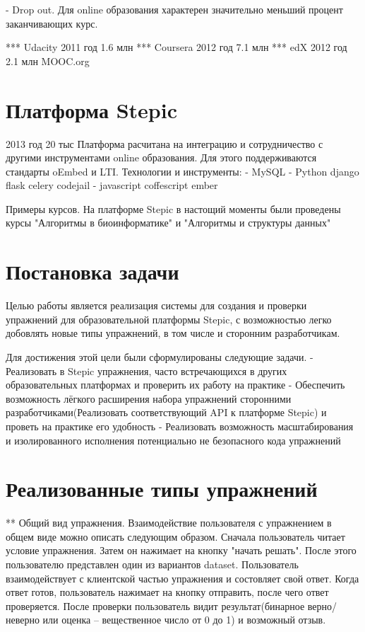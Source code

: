 \documentclass{matmex-diploma-custom}
\begin{document}
- Drop out. Для online образования характерен значительно меньший
  процент заканчивающих курс.

*** Udacity
   2011 год
   1.6 млн
*** Coursera
   2012 год
   7.1 млн
*** edX
   2012 год
   2.1 млн
   MOOC.org

\section{Платформа Stepic}
2013 год
20 тыс
Платформа расчитана на интеграцию и сотрудничество с другими инструментами
online образования. Для этого поддерживаются стандарты oEmbed и LTI.
Технологии и инструменты:
  -  MySQL
  -  Python django flask celery codejail
  -  javascript coffescript ember

Примеры курсов.
На платформе Stepic в настощий моменты были проведены курсы
"Алгоритмы в биоинформатике" и "Алгоритмы и структуры данных"

\section{Постановка задачи}
Целью работы является реализация системы для создания и проверки
упражнений для образовательной платформы Stepic, с возможностью легко
добовлять новые типы упражнений, в том числе и сторонним
разработчикам.

Для достижения этой цели были сформулированы следующие задачи.
- Реализовать в Stepic упражнения, часто встречающихся в других
  образовательных платформах и проверить их работу на практике
- Обеспечить возможность лёгкого расширения набора упражнений
  сторонними разработчиками(Реализовать соответствующий API к
  платформе Stepic) и проветь на практике его удобность
- Реализовать возможность масштабирования и изолированного исполнения
  потенциально не безопасного кода упражнений

\section{Реализованные типы упражнений}
** Общий вид упражнения.
   Взаимодействие пользователя с упражнением в общем виде можно
   описать следующим образом.  Сначала пользователь читает условие
   упражнения. Затем он нажимает на кнопку "начать решать". После
   этого пользователю представлен один из вариантов
   dataset. Пользователь взаимодействует с клиентской частью
   упражнения и состовляет свой ответ. Когда ответ готов, пользователь
   нажимает на кнопку отправить, после чего ответ проверяется. После
   проверки пользователь видит результат(бинарное верно/неверно или
   оценка -- вещественное число от 0 до 1) и возможный отзыв.
\end{document}
